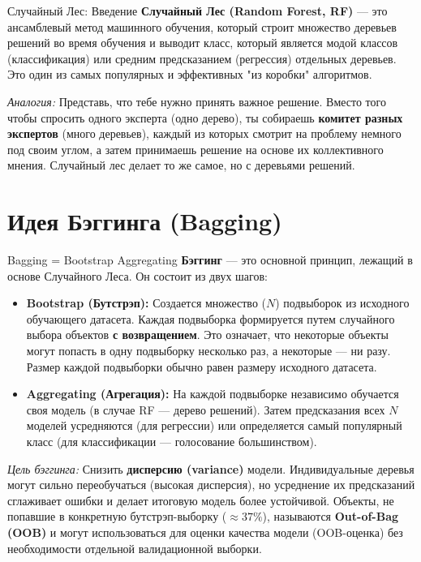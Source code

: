 
\begin{myblock}{Случайный Лес: Введение}
    \textbf{Случайный Лес (Random Forest, RF)} — это ансамблевый метод машинного обучения, который строит множество деревьев решений во время обучения и выводит класс, который является модой классов (классификация) или средним предсказанием (регрессия) отдельных деревьев. Это один из самых популярных и эффективных "из коробки" алгоритмов.
    
    \textit{Аналогия:} Представь, что тебе нужно принять важное решение. Вместо того чтобы спросить одного эксперта (одно дерево), ты собираешь \textbf{комитет разных экспертов} (много деревьев), каждый из которых смотрит на проблему немного под своим углом, а затем принимаешь решение на основе их коллективного мнения. Случайный лес делает то же самое, но с деревьями решений.
\end{myblock}

\section{Идея Бэггинга (Bagging)}

\begin{textbox}{Bagging = Bootstrap Aggregating}
    \textbf{Бэггинг} — это основной принцип, лежащий в основе Случайного Леса. Он состоит из двух шагов:
    \begin{itemize}
        \item \textbf{Bootstrap (Бутстрэп):} Создается множество (\(N\)) подвыборок из исходного обучающего датасета. Каждая подвыборка формируется путем случайного выбора объектов \textbf{с возвращением}. Это означает, что некоторые объекты могут попасть в одну подвыборку несколько раз, а некоторые — ни разу. Размер каждой подвыборки обычно равен размеру исходного датасета.
        \item \textbf{Aggregating (Агрегация):} На каждой подвыборке независимо обучается своя модель (в случае RF — дерево решений). Затем предсказания всех \(N\) моделей усредняются (для регрессии) или определяется самый популярный класс (для классификации — голосование большинством).
    \end{itemize}
    \textit{Цель бэггинга:} Снизить \textbf{дисперсию (variance)} модели. Индивидуальные деревья могут сильно переобучаться (высокая дисперсия), но усреднение их предсказаний сглаживает ошибки и делает итоговую модель более устойчивой.
    Объекты, не попавшие в конкретную бутстрэп-выборку (\(\approx 37\%\)), называются \textbf{Out-of-Bag (OOB)} и могут использоваться для оценки качества модели (OOB-оценка) без необходимости отдельной валидационной выборки.
\end{textbox}

